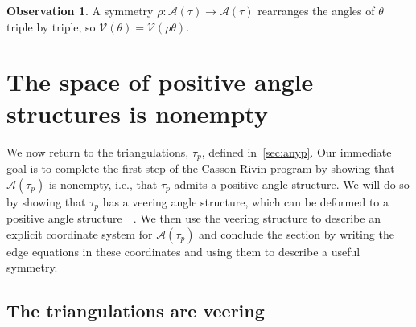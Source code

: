 \documentclass[reqno]{amsart}
\theoremstyle{plain}
\theoremstyle{definition}
\newtheorem{observation}{Observation}
\begin{document}
\begin{observation}\label{obs:equalvolume}
A symmetry $\rho:\mathcal A(\tau)\rightarrow\mathcal A(\tau)$ rearranges the angles of $\theta$ triple by triple, so $\mathcal{V}(\theta)= \mathcal{V}(\rho\theta)$.
\end{observation}

\section{The space of positive angle structures is nonempty}  \label{sec:anglestructuresnonempty}

We now return to the triangulations, $\tau_{p}$, defined in~\ref{sec:anyp}.  Our immediate goal is to complete the first step of the Casson-Rivin program by showing that $\mathcal A(\tau_{p})$ is nonempty, i.e., that $\tau_{p}$ admits a positive angle structure.  We will do so by showing that  $\tau_{p}$ has a veering angle structure, which can be deformed to a positive angle structure~\cite{HodgsonEtal}~\cite{veering}.  We then use the veering structure to describe an explicit coordinate system for $\mathcal A(\tau_{p})$ and conclude the section by writing the edge equations in these coordinates and using them to describe a useful symmetry.


\subsection{The triangulations are veering}\label{sec:veering}
\end{document}
